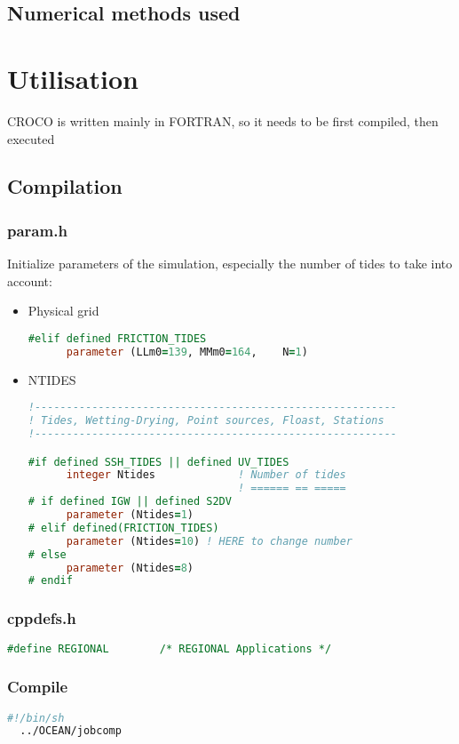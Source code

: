 \documentclass{article}
\begin{document}
\subsection{Numerical methods used}
\section{Utilisation}
CROCO is written mainly in FORTRAN, so it needs to be first compiled, then executed
\subsection{Compilation}
\subsubsection{param.h}
Initialize parameters of the simulation, especially the number of tides to take into account:
\begin{itemize}
\item Physical grid
  \begin{lstlisting}[language=Fortran]
    #elif defined FRICTION_TIDES
      parameter (LLm0=139, MMm0=164,    N=1) 
    \end{lstlisting}
  \item NTIDES
    \begin{lstlisting}[language=Fortran]
!---------------------------------------------------------
! Tides, Wetting-Drying, Point sources, Floast, Stations
!---------------------------------------------------------

#if defined SSH_TIDES || defined UV_TIDES
      integer Ntides             ! Number of tides
                                 ! ====== == =====
# if defined IGW || defined S2DV
      parameter (Ntides=1)
# elif defined(FRICTION_TIDES)
      parameter (Ntides=10) ! HERE to change number
# else
      parameter (Ntides=8)
# endif
\end{lstlisting}

\end{itemize}
\subsubsection{cppdefs.h}
\begin{lstlisting}[language=Fortran]
#define REGIONAL        /* REGIONAL Applications */
\end{lstlisting}


\subsubsection{Compile}
\begin{lstlisting}[language=bash]
  #!/bin/sh
  ../OCEAN/jobcomp
\end{lstlisting}
\end{document}
